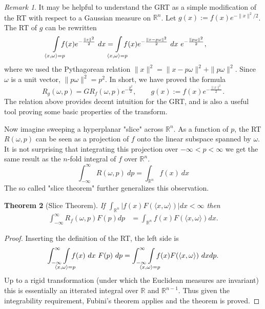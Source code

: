 \documentclass{amsart}
\newtheorem{theorem}{Theorem}[section]
\theoremstyle{remark}
\newtheorem{remark}[theorem]{Remark}
\numberwithin{equation}{section}
\newcommand{\RR}{\mathbb{R}}
\def\mclimits_#1{\limits_{\mathclap{#1}}}
\begin{document}
\begin{remark}
It may be helpful to understand the GRT as a simple modification of the RT with respect to a Gaussian measure on $\RR^n$. Let $g(x) := f(x)e^{-\|x\|^2/2}$. The RT of $g$ can be rewritten
\begin{align*}
    \int\mclimits_{\langle x, \omega \rangle = p} f(x) e^{-\frac{\|x\|^2} 2} ~dx
    &= \int\mclimits_{\langle x, \omega \rangle = p} f(x) e^{-\frac{\|x - p\omega\|^2} 2} ~dx~ e^{-\frac{\|p\omega\|^2} 2},
\end{align*}
where we used the Pythagorean relation $\|x\|^2 = \|x - p\omega\|^2 + \|p\omega\|^2$. Since $\omega$ is a unit vector, $\|p\omega\|^2 = p^2$. In short, we have proved the formula
\begin{equation}
    \label{eq:1}
    R_g(\omega, p) = GR_f(\omega, p)e^{-\frac{p^2} 2}, \qquad g(x) := f(x)e^{-\frac{\|x\|^2} 2}.
\end{equation}
The relation above provides decent intuition for the GRT, and is also a useful tool proving some basic properties of the transform.
\end{remark}

Now imagine sweeping a hyperplanar "slice" across $\RR^n$. As a function of $p$, the RT $R(\omega, p)$ can be seen as a projection of $f$ onto the linear subspace spanned by $\omega$. It is not surprising that integrating this projection over $-\infty < p < \infty$ we get the same result as the $n$-fold integral of $f$ over $\RR^n$.
\[
    \int_{-\infty}^\infty R(\omega, p) ~dp = \int_{\RR^n} f(x) ~dx
\]
The so called "slice theorem" further generalizes this observation.
\begin{theorem}[Slice Theorem]
    If $\int_{\mathbb{R}^n} |f(x) F(\langle x, \omega \rangle)| dx < \infty$ then
    \begin{align}
        \label{eq:ST}
        \int_{-\infty}^\infty R_f(\omega, p) F(p) dp 
        &= \int_{\mathbb{R}^n} f(x) F(\langle x, \omega \rangle) dx.
    \end{align}
\end{theorem}

\begin{proof}
Inserting the definition of the RT, the left side is
\[
    \int_{-\infty}^\infty \int\mclimits_{\langle x, \omega \rangle = p} f(x) ~dx~ F(p) ~dp 
    = \int_{-\infty}^\infty \int\mclimits_{\langle x, \omega \rangle = p} f(x) F(\langle x, \omega \rangle) ~dx dp.
\]
Up to a rigid transformation (under which the Euclidean measures are invariant) this is essentially an itterated integral over $\RR$ and $\RR^{n-1}$. Thus given the integrability requirement, Fubini's theorem applies and the theorem is proved.
\end{proof}
\end{document}
